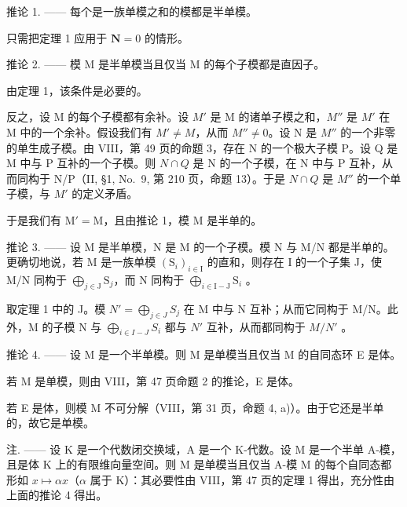 推论 1. —— 每个是一族单模之和的模都是半单模。

只需把定理 1 应用于 \(\mathbf{N} = 0\) 的情形。

推论 2. —— 模 M 是半单模当且仅当 M 的每个子模都是直因子。

由定理 1，该条件是必要的。

反之，设 M 的每个子模都有余补。设 \(M'\) 是 M 的诸单子模之和，\(M''\) 是 \(M'\) 在 M 中的一个余补。假设我们有 \(M' \neq M\)，从而 \(M'' \neq 0\)。设 N 是 \(M''\) 的一个非零的单生成子模。由 VIII，第 49 页的命题 3，存在 N 的一个极大子模 P。设 Q 是 M 中与 P 互补的一个子模。则 \(N \cap Q\) 是 N 的一个子模，在 N 中与 P 互补，从而同构于 N/P（II, §1, No.~9, 第 210 页，命题 13）。于是 \(N \cap Q\) 是 \(M''\) 的一个单子模，与 \(M'\) 的定义矛盾。

于是我们有 \(\mathrm{M}' = \mathrm{M}\)，且由推论 1，模 \(\mathrm{M}\) 是半单的。

推论 3. —— 设 M 是半单模，N 是 M 的一个子模。模 N 与 M/N 都是半单的。更确切地说，若 M 是一族单模 \((\mathrm{S}_i)_{i\in \mathrm{I}}\) 的直和，则存在 I 的一个子集 J，使 M/N 同构于 \(\bigoplus_{j\in \mathrm{J}}\mathrm{S}_j\)，而 N 同构于 \(\bigoplus_{i\in \mathrm{I - J}}\mathrm{S}_i\) 。

取定理 1 中的 J。模 \(N' = \bigoplus_{j \in J} S_j\) 在 M 中与 N 互补；从而它同构于 M/N。此外，M 的子模 N 与 \(\bigoplus_{i \in I-J} S_i\) 都与 \(N'\) 互补，从而都同构于 \(M/N'\) 。

推论 4. —— 设 M 是一个半单模。则 M 是单模当且仅当 M 的自同态环 E 是体。

若 M 是单模，则由 VIII，第 47 页命题 2 的推论，E 是体。

若 E 是体，则模 M 不可分解（VIII，第 31 页，命题 4, a)）。由于它还是半单的，故它是单模。

注. —— 设 K 是一个代数闭交换域，A 是一个 K-代数。设 M 是一个半单 A-模，且是体 K 上的有限维向量空间。则 M 是单模当且仅当 A-模 M 的每个自同态都形如 \(x \mapsto \alpha x\)（\(\alpha\) 属于 K）：其必要性由 VIII，第 47 页的定理 1 得出，充分性由上面的推论 4 得出。

